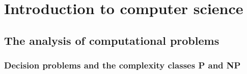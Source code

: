 \documentclass[../../master.tex]{subfiles}
\begin{document}
\setcounter{chapter}{2}
\chapter{Introduction to computer science}
\setcounter{section}{1}
\section{The analysis of computational problems}
\setcounter{subsection}{2}
\subsection{Decision problems and the complexity classes P and NP}
\end{document}
